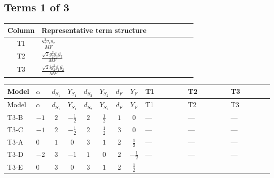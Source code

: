 \documentclass[8pt]{article}
\begin{document}
\begin{landscape}
\subsection*{Terms 1 of 3}
\begin{center}
\begin{tabular}{@{}c >{\raggedright\arraybackslash}p{0.82\linewidth}@{}}
\toprule
Column & Representative term structure \\
\midrule
T1 & \(\displaystyle \frac{g_{2}^{2} \overline{y_{1}} \overline{y_{2}}}{MF}\) \\
\midrule
T2 & \(\displaystyle \frac{\sqrt{2} g_{2}^{2} \overline{y_{1}} \overline{y_{2}}}{MF}\) \\
\midrule
T3 & \(\displaystyle \frac{\sqrt{2} i g_{2}^{2} \overline{y_{1}} \overline{y_{2}}}{MF}\) \\
\midrule
\bottomrule
\end{tabular}
\end{center}
\smallskip
\tiny
\begin{longtable}{@{}llcccccc >{\raggedright\arraybackslash}p{0.21\linewidth} >{\raggedright\arraybackslash}p{0.21\linewidth} >{\raggedright\arraybackslash}p{0.21\linewidth}@{}}
\toprule
Model & $\alpha$ & $d_{S_1}$ & $Y_{S_1}$ & $d_{S_2}$ & $Y_{S_2}$ & $d_F$ & $Y_F$ & T1 & T2 & T3 \\
\midrule
\endfirsthead
\toprule
Model & $\alpha$ & $d_{S_1}$ & $Y_{S_1}$ & $d_{S_2}$ & $Y_{S_2}$ & $d_F$ & $Y_F$ & T1 & T2 & T3 \\
\midrule
\endhead
T3-B & $-1$ & $2$ & $-\frac{1}{2}$ & $2$ & $\frac{1}{2}$ & $1$ & $0$ & --- & --- & --- \\
\midrule
T3-C & $-1$ & $2$ & $-\frac{1}{2}$ & $2$ & $\frac{1}{2}$ & $3$ & $0$ & --- & --- & --- \\
\midrule
T3-A & $0$ & $1$ & $0$ & $3$ & $1$ & $2$ & $\frac{1}{2}$ & --- & --- & --- \\
\midrule
T3-D & $-2$ & $3$ & $-1$ & $1$ & $0$ & $2$ & $-\frac{1}{2}$ & --- & --- & --- \\
\midrule
T3-E & $0$ & $3$ & $0$ & $3$ & $1$ & $2$ & $\frac{1}{2}$ & \scriptsize\adjustbox{max width=\linewidth}{$\begin{gathered} - \frac{g_{2}^{2} \overline{y_{1}} \overline{y_{2}}}{MF}\end{gathered}$} & \scriptsize\adjustbox{max width=\linewidth}{$\begin{gathered} - \frac{\sqrt{2} g_{2}^{2} \overline{y_{1}} \overline{y_{2}}}{4 MF}\end{gathered}$} & \scriptsize\adjustbox{max width=\linewidth}{$\begin{gathered} - \frac{49 \sqrt{2} i g_{2}^{2} \overline{y_{1}} \overline{y_{2}}}{16 MF}\end{gathered}$} \\
\midrule
\bottomrule
\end{longtable}
\clearpage

\end{landscape}
\end{document}

